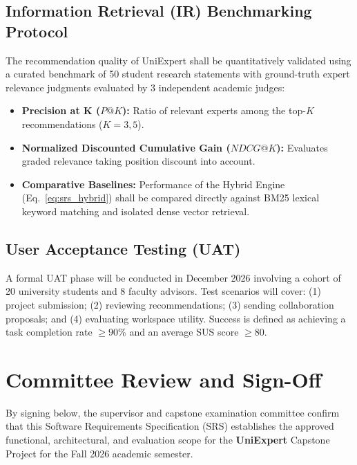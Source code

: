 \documentclass[11pt,a4paper]{article}
\begin{document}
\subsection{Information Retrieval (IR) Benchmarking Protocol}
The recommendation quality of UniExpert shall be quantitatively validated using a curated benchmark of 50 student research statements with ground-truth expert relevance judgments evaluated by 3 independent academic judges:
\begin{itemize}[noitemsep]
    \item \textbf{Precision at K ($P@K$):} Ratio of relevant experts among the top-$K$ recommendations ($K=3, 5$).
    \item \textbf{Normalized Discounted Cumulative Gain ($NDCG@K$):} Evaluates graded relevance taking position discount into account.
    \item \textbf{Comparative Baselines:} Performance of the Hybrid Engine (Eq.~\ref{eq:srs_hybrid}) shall be compared directly against BM25 lexical keyword matching and isolated dense vector retrieval.
\end{itemize}

\subsection{User Acceptance Testing (UAT)}
A formal UAT phase will be conducted in December 2026 involving a cohort of 20 university students and 8 faculty advisors. Test scenarios will cover: (1) project submission; (2) reviewing recommendations; (3) sending collaboration proposals; and (4) evaluating workspace utility. Success is defined as achieving a task completion rate $\ge 90\%$ and an average SUS score $\ge 80$.

\vspace{0.8cm}
\section{Committee Review and Sign-Off}

By signing below, the supervisor and capstone examination committee confirm that this Software Requirements Specification (SRS) establishes the approved functional, architectural, and evaluation scope for the \textbf{UniExpert} Capstone Project for the Fall 2026 academic semester.
\end{document}
